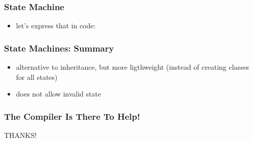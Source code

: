 \documentclass{beamer}
\begin{document}
\begin{frame}
  \frametitle{State Machine}
  \begin{itemize}
  \item let's express that in code:
  \end{itemize}
\end{frame}

\begin{frame}
  \frametitle{State Machines: Summary}
  \begin{itemize}
  \item alternative to inheritance, but more ligthweight (instead of
    creating classes for all states)
  \item does not allow invalid state
  \end{itemize}
\end{frame}

\begin{frame}
  \frametitle{The Compiler Is There To Help!}
  \vfill
  \begin{center}
    {\Huge THANKS!}
  \end{center}
\end{frame}
\end{document}
